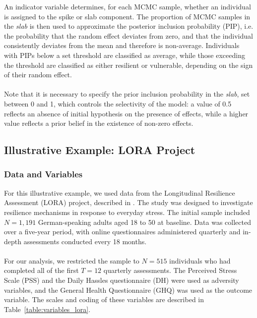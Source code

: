 \documentclass[12pt]{article}
\begin{document}
An indicator variable determines, for each MCMC sample, whether an individual is assigned to the spike or slab component. The proportion of MCMC samples in the \textit{slab} is then used to approximate the posterior inclusion probability (PIP), i.e. the probability that the random effect deviates from zero, and that the individual consistently deviates from the mean and therefore is non-average. Individuals with PIPs below a set threshold are classified as average, while those exceeding the threshold are classified as either resilient or vulnerable, depending on the sign of their random effect.\\
\\
Note that it is necessary to specify the prior inclusion probability in the \textit{slab}, set between 0 and 1, which controls the selectivity of the model: a value of 0.5 reflects an absence of initial hypothesis on the presence of effects, while a higher value reflects a prior belief in the existence of non-zero effects.

\subsection{Illustrative Example: LORA Project}
\subsubsection{Data and Variables}
For this illustrative example, we used data from the Longitudinal Resilience Assessment (LORA) project, described in \cite{LORA}. The study was designed to investigate resilience mechanisms in response to everyday stress. The initial sample included \( N = 1{,}191 \) German-speaking adults aged 18 to 50 at baseline. Data was collected over a five-year period, with online questionnaires administered quarterly and in-depth assessments conducted every 18 months.\\
\\
For our analysis, we restricted the sample to \( N = 515 \) individuals who had completed all of the first \( T = 12 \) quarterly assessments. The Perceived Stress Scale (PSS) and the Daily Hassles questionnaire (DH) were used as adversity variables, and the General Health Questionnaire (GHQ) was used as the outcome variable. The scales and coding of these variables are described in Table~\ref{table:variables_lora}.
\end{document}
